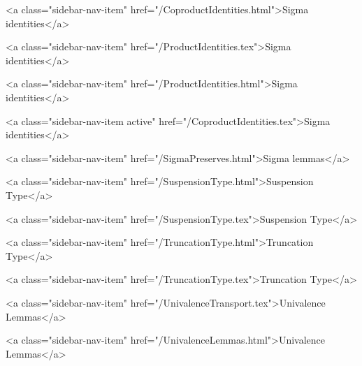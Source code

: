       
    
      
        
          <a class="sidebar-nav-item" href="/CoproductIdentities.html">Sigma identities</a>
        
      
    
      
        
          <a class="sidebar-nav-item" href="/ProductIdentities.tex">Sigma identities</a>
        
      
    
      
        
          <a class="sidebar-nav-item" href="/ProductIdentities.html">Sigma identities</a>
        
      
    
      
        
          <a class="sidebar-nav-item active" href="/CoproductIdentities.tex">Sigma identities</a>
        
      
    
      
        
          <a class="sidebar-nav-item" href="/SigmaPreserves.html">Sigma lemmas</a>
        
      
    
      
        
          <a class="sidebar-nav-item" href="/SuspensionType.html">Suspension Type</a>
        
      
    
      
        
          <a class="sidebar-nav-item" href="/SuspensionType.tex">Suspension Type</a>
        
      
    
      
        
          <a class="sidebar-nav-item" href="/TruncationType.html">Truncation Type</a>
        
      
    
      
        
          <a class="sidebar-nav-item" href="/TruncationType.tex">Truncation Type</a>
        
      
    
      
        
          <a class="sidebar-nav-item" href="/UnivalenceTransport.tex">Univalence Lemmas</a>
        
      
    
      
        
          <a class="sidebar-nav-item" href="/UnivalenceLemmas.html">Univalence Lemmas</a>
        
